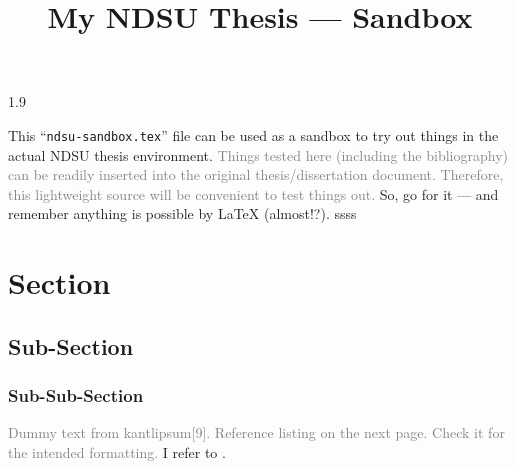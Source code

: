 \documentclass[12pt,mathdesign,showgrid]{ndsu-thesis-2022}
\title{My NDSU Thesis --- Sandbox}
\newcommand\myspacing{1.9} %
\begin{document}
\begin{spacing}{\myspacing}      %


This ``\texttt{ndsu-sandbox.tex}'' file can be used as a sandbox to try out things in the actual NDSU thesis environment. \textcolor{gray}{Things tested here (including the bibliography) can be readily inserted into the original thesis/dissertation document. Therefore, this lightweight source will be convenient to test things out.} So, go for it --- and remember anything is possible by \LaTeX{} (almost!?). ssss

\section{Section}
\subsection{Sub-Section}
\subsubsection{Sub-Sub-Section}

\textcolor{gray}{Dummy text from kantlipsum[9]. Reference listing on the next page. Check it for the intended formatting.} I refer to \citep{lamport94,kopka2004guide,baczkowski1990ndsu,cassuto2010advising,pires2021teens}. \kant[9]

\makerefs%

\end{spacing}
\end{document}
